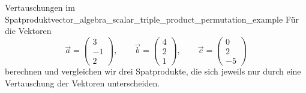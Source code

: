 \begin{ExampleBox}{Vertauschungen im Spatprodukt}{vector_algebra_scalar_triple_product_permutation_example}
  Für die Vektoren
  \[
    \vec a=\begin{pmatrix}3\\-1\\2\end{pmatrix},\qquad
    \vec b=\begin{pmatrix}4\\2\\1\end{pmatrix},\qquad
    \vec c=\begin{pmatrix}0\\2\\-5\end{pmatrix}
  \]
  berechnen und vergleichen wir drei Spatprodukte, die sich jeweils nur durch
  eine Vertauschung der Vektoren unterscheiden.
  \begin{center}
  \end{center}
\end{ExampleBox}
